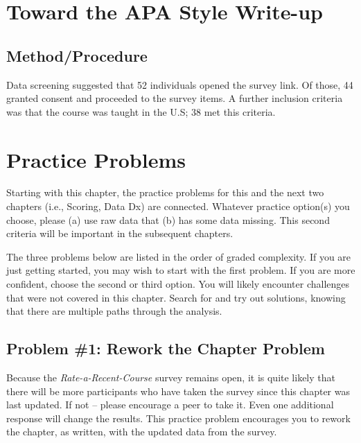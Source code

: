 \documentclass[
  english,
]{book}
\begin{document}
\hypertarget{toward-the-apa-style-write-up}{%
\section{Toward the APA Style Write-up}\label{toward-the-apa-style-write-up}}

\hypertarget{methodprocedure}{%
\subsection{Method/Procedure}\label{methodprocedure}}

Data screening suggested that 52 individuals opened the survey link. Of those, 44 granted consent and proceeded to the survey items. A further inclusion criteria was that the course was taught in the U.S; 38 met this criteria.

\hypertarget{practice-problems}{%
\section{Practice Problems}\label{practice-problems}}

Starting with this chapter, the practice problems for this and the next two chapters (i.e., Scoring, Data Dx) are connected. Whatever practice option(s) you choose, please (a) use raw data that (b) has some data missing. This second criteria will be important in the subsequent chapters.

The three problems below are listed in the order of graded complexity. If you are just getting started, you may wish to start with the first problem. If you are more confident, choose the second or third option. You will likely encounter challenges that were not covered in this chapter. Search for and try out solutions, knowing that there are multiple paths through the analysis.

\hypertarget{problem-1-rework-the-chapter-problem}{%
\subsection{Problem \#1: Rework the Chapter Problem}\label{problem-1-rework-the-chapter-problem}}

Because the \emph{Rate-a-Recent-Course} survey remains open, it is quite likely that there will be more participants who have taken the survey since this chapter was last updated. If not -- please encourage a peer to take it. Even one additional response will change the results. This practice problem encourages you to rework the chapter, as written, with the updated data from the survey.
\end{document}
